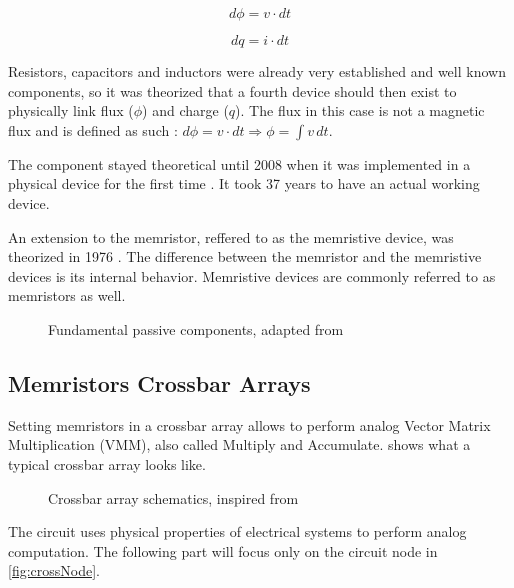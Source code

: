 \begin{equation}
  d\phi = v\cdot dt
\end{equation}

\begin{equation}
  dq = i\cdot dt
\end{equation}

Resistors, capacitors and inductors were already very established and well known components, so it was theorized that a fourth device should then exist to physically link flux ($\phi$) and charge ($q$).  The flux in this case is not a magnetic flux and is defined as such : $ d\phi=v\cdot dt \Rightarrow \phi =  \int v \,dt  $.

The component stayed theoretical until 2008 when it was implemented in a physical device for the first time \cite{memristorFab}. It took 37 years to have an actual working device.

An extension to the memristor, reffered to as the memristive device, was theorized in 1976 \cite{memrestiveDev}. The difference between the memristor and the memristive devices is its internal behavior. Memristive devices are commonly referred to as memristors as well.

\begin{figure}[t]
  \centering
  
  \caption{Fundamental passive components, adapted from \cite{memWiki}}
  \label{fig:fundComp}
\end{figure}

\subsection{Memristors Crossbar Arrays}

Setting memristors in a crossbar array allows to perform analog Vector Matrix Multiplication (VMM), also called Multiply and Accumulate.  shows what a typical crossbar array looks like.

\begin{figure}[b]
  \centering
  
  \caption{Crossbar array schematics, inspired from \cite{xbarFigures}}
  \label{fig:crossbar}
\end{figure}

The circuit uses physical properties of electrical systems to perform analog computation. The following part will focus only on the circuit node in \cref{fig:crossNode}.

